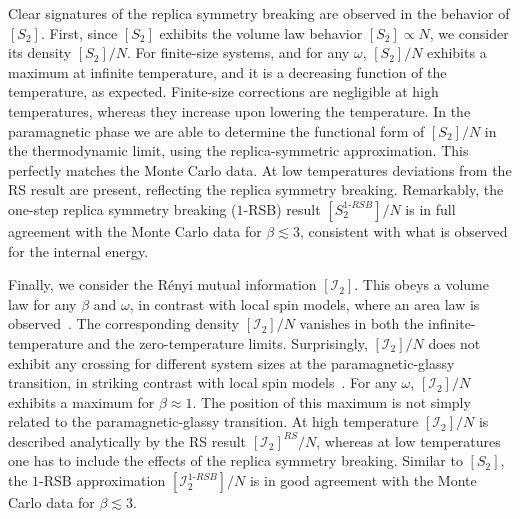 \documentclass[twocolumn,superscriptaddress,prb,10pt]{revtex4-1}
\begin{document}
Clear signatures of the replica symmetry breaking are observed in the behavior of $[S_2]$. 
First, since $[S_2]$ exhibits the volume law behavior $[S_2]\propto N$, 
we consider its density $[S_2]/N$. For finite-size systems, and for any $\omega$, $[S_2]/N$ 
exhibits a maximum at infinite temperature, and it is a decreasing function of the temperature, 
as expected. Finite-size corrections are negligible at high temperatures, whereas they increase 
upon lowering the temperature. In the paramagnetic phase we are able to determine the functional 
form of $[S_2]/N$ in the thermodynamic limit, using the replica-symmetric approximation. This 
perfectly matches the Monte Carlo data. At low temperatures deviations from the RS result are 
present, reflecting the replica symmetry breaking. Remarkably, the one-step replica symmetry 
breaking ($1$-RSB) result $[S_2^{1\textrm{-}RSB}]/N$ is in full agreement with the Monte Carlo 
data for $\beta\lesssim 3$, consistent with what is observed for the internal energy. 

Finally, we consider the R\'enyi mutual information $[{\mathcal I}_2]$. This obeys a volume 
law for any $\beta$ and $\omega$, in contrast with local spin models, where an area law is 
observed~\cite{wolf-2008}. The corresponding density $[{\mathcal I}_2]/N$ vanishes in 
both the infinite-temperature and the zero-temperature limits. Surprisingly, $[{\mathcal I}_2]/N$ 
does not exhibit any crossing for different system sizes at the paramagnetic-glassy transition, 
in striking contrast with local spin models~\cite{jaconis-2013}. For any $\omega$, $[{\mathcal I}_2]/N$ 
exhibits a maximum for $\beta\approx 1$. The position of this maximum is not simply 
related to the paramagnetic-glassy transition. At high temperature $[{\mathcal I}_2]/N$ 
is described analytically by the RS result $[{\mathcal I}_2]^{RS}/N$, whereas at low temperatures 
one has to include the effects of the replica symmetry breaking. Similar to $[S_2]$, the $1$-RSB 
approximation $[{\mathcal I}^{1\textrm{-}RSB}_2]/N$ is in good agreement with the Monte Carlo 
data for $\beta\lesssim 3$.
\end{document}
